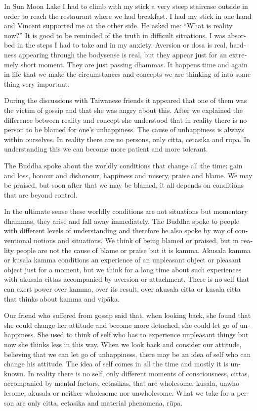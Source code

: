 \textdutch{In Sun Moon Lake I had to climb with my stick a very steep
staircase outside in order to reach the restaurant where we had
breakfast. I had my stick in one hand and Vincent supported me at the
other side. He asked me: ``What is reality now?'' It is good to be
reminded of the truth in difficult situations. I was absorbed in the
steps I had to take and in my anxiety. Aversion or dosa is real,
hardness appearing through the bodysense is real, but they appear just
for an extremely short moment. They are just passing dhammas. It happens
time and again in life that we make the circumstances and concepts we
are thinking of into something very important. }

\textdutch{During the discussions with Taiwanese friends it appeared
that one of them was the victim of gossip and that she was angry about
this. After we explained the difference between reality and concept she
understood that in reality there is no person to be blamed for one's
unhappiness. The cause of unhappiness is always within ourselves. In
reality there are no persons, only citta, cetasika and rūpa. In
understanding this we can become more patient and more tolerant. }

\textdutch{The Buddha spoke about the worldly conditions that change all
the time: gain and loss, honour and dishonour, happiness and misery,
praise and blame. We may be praised, but soon after that we may be
blamed, it all depends on conditions that are beyond control. }

\textdutch{In the ultimate sense these worldly conditions are not
situations but momentary dhammas, they arise and fall away immediately.
The Buddha spoke to people with different levels of understanding and
therefore he also spoke by way of conventional notions and situations.
We think of being blamed or praised, but in reality people are not the
cause of blame or praise but it is kamma. Akusala kamma or kusala kamma
conditions an experience of an unpleasant object or pleasant object just
for a moment, but we think for a long time about such experiences with
akusala cittas accompanied by aversion or attachment. There is no self
that can exert power over kamma, over its result, over akusala citta or
kusala citta that thinks about kamma and vipāka.}

\textdutch{Our friend who suffered from gossip said that, when looking
back, she found that she could change her attitude and become more
detached, she could let go of unhappiness. She used to think of self who
has to experience unpleasant things but now she thinks less in this way.
When we look back and consider our attitude, believing that we can let
go of unhappiness, there may be an idea of self who can change his
attitude. The idea of self comes in all the time and mostly it is
unknown. In reality there is no self, only different moments of
consciousness, cittas, accompanied by mental factors, cetasikas, that
are wholesome, kusala, unwholesome, akusala or neither wholesome nor
unwholesome. What we take for a person are only citta, cetasika and
material phenomena, rūpa. }

